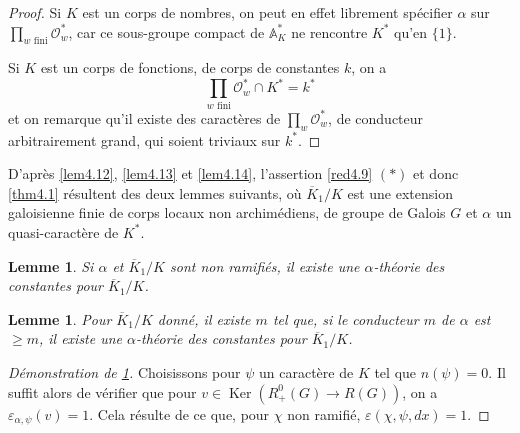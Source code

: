 \documentclass[11pt,a4paper]{amsart}
\theoremstyle{plain}
\newtheorem{lemma}[theorem]{Lemme}
\theoremstyle{definition}
\DeclareMathOperator{\Ker}{Ker}
\newcommand{\dbA}{\mathbb{A}}
\newcommand{\scrO}{\mathscr{O}}
\newcommand{\ov}[1]{\overline{#1}}
\newcommand{\eps}{\varepsilon}
\begin{document}
\begin{proof}
Si $K$ est un corps de nombres, on peut en effet librement sp\'ecifier $\alpha$ sur $\prod_{w \text{ fini}} \scrO_{w}^{*}$, car ce sous-groupe compact de $\dbA_{K}^{*}$ ne rencontre $K^{*}$ qu'en $\{1\}$.

Si $K$ est un corps de fonctions, de corps de constantes $k$, on a
\[
\prod_{w \text{ fini}} \scrO_{w}^{*} \cap K^{*} = k^{*}
\]
et on remarque qu'il existe des caract\`eres de $\prod_{w} \scrO_{w}^{*}$, de conducteur arbitrairement grand, qui soient triviaux sur $k^{*}$.
\end{proof}

D'apr\`es \ref{lem4.12}, \ref{lem4.13} et \ref{lem4.14}, l'assertion \ref{red4.9} $(*)$ et donc \ref{thm4.1} r\'esultent des deux lemmes suivants, o\`u $\ov{K}_{1}/K$ est une extension galoisienne finie de corps locaux non archim\'ediens, de groupe de Galois $G$ et $\alpha$ un quasi-caract\`ere de $K^{*}$.

\begin{lemma}\label{lem4.15}
Si $\alpha$ et $\ov{K}_{1}/K$ sont non ramifi\'es, il existe une $\alpha$-th\'eorie des constantes pour $\ov{K}_{1}/K$.
\end{lemma}

\begin{lemma}\label{lem4.16}
Pour $\ov{K}_{1}/K$ donn\'e, il existe $m$ tel que, si le conducteur $m$ de $\alpha$ est $\geq m$, il existe une $\alpha$-th\'eorie des constantes pour $\ov{K}_{1}/K$.
\end{lemma}

\begin{proof}[D\'emonstration de \ref{lem4.15}]
Choisissons pour $\psi$ un caract\`ere de $K$ tel que $n(\psi) = 0$. Il suffit alors de v\'erifier que pour $v \in \Ker(R_{+}^{0}(G) \to R(G))$, on a $\eps_{\alpha,\psi}(v) = 1$. Cela r\'esulte de ce que, pour $\chi$ non ramifi\'e, $\eps(\chi,\psi,dx) = 1$.
\end{proof}
\end{document}
